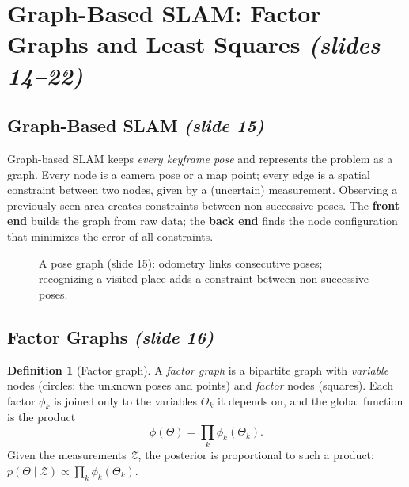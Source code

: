 \documentclass[11pt,a4paper]{article}
\newcommand{\slr}[1]{\texorpdfstring{\emph{(slides #1)}}{(slides #1)}}
\newcommand{\slrs}[1]{\texorpdfstring{\emph{(slide #1)}}{(slide #1)}}
\newcommand{\bx}{\bm{x}}
\theoremstyle{definition}
\newtheorem{definition}{Definition}[section]
\theoremstyle{plain}
\theoremstyle{remark}
\begin{document}
\section{Graph-Based SLAM: Factor Graphs and Least Squares \slr{14--22}}
\subsection{Graph-Based SLAM \slrs{15}}
Graph-based SLAM keeps \emph{every keyframe pose} and represents the problem as a graph. Every node is a camera pose or a map point; every edge is a spatial constraint between two nodes, given by a (uncertain) measurement. Observing a previously seen area creates constraints between non-successive poses. The \textbf{front end} builds the graph from raw data; the \textbf{back end} finds the node configuration that minimizes the error of all constraints.

\begin{figure}[htbp]\centering
{}
\caption{A pose graph (slide 15): odometry links consecutive poses; recognizing a visited place adds a constraint between non-successive poses.}
\end{figure}

\subsection{Factor Graphs \slrs{16}}
\begin{definition}[Factor graph]\label{def:fg}
A \emph{factor graph} is a bipartite graph with \emph{variable} nodes (circles: the unknown poses and points) and \emph{factor} nodes (squares). Each factor $\phi_k$ is joined only to the variables $\Theta_k$ it depends on, and the global function is the product
\[
\phi(\Theta)=\prod_k\phi_k(\Theta_k).
\]
Given the measurements $\mathcal Z$, the posterior is proportional to such a product: $p(\Theta\mid\mathcal Z)\propto\prod_k\phi_k(\Theta_k)$.
\end{definition}
\end{document}
